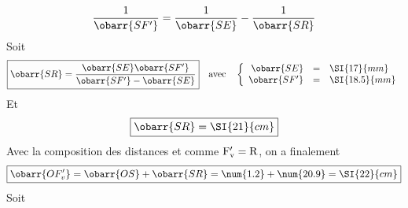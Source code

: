 \documentclass[../TDO4.tex]{subfiles}%
\begin{document}
\begin{blocQR}
{\begin{center}
\begin{tcn}
				\[
					\frac{1}{\obarr{SF'}} =
					\frac{1}{\obarr{SE}} -
					\frac{1}{\obarr{SR}}
				\]
				Soit
				\begin{equation*}
					\boxed{
						\obarr{SR} =
						\frac{
							\obarr{SE}\obarr{SF'}}{
							\obarr{SF'}-\obarr{SE}}
					}
					\quad \text{avec}\quad
					\left\{
					\begin{array}{rcl}
						\obarr{SE}  & = & \SI{17}{mm}   \\
						\obarr{SF'} & = & \SI{18.5}{mm}
					\end{array}
					\right.
				\end{equation*}
				Et
				\[
					\boxed{\obarr{SR} = \SI{21}{cm}}
				\]
				Avec la composition des distances et comme $\rm F'_v = R$,
				on a finalement
				\[
					\boxed{
						\obarr{OF'_v} =
						\obarr{OS} + \obarr{SR} =
						\num{1.2}+\num{20.9} = \SI{22}{cm}}
				\]
				Soit 
			\end{tcn}
		\end{center}
	}%
\end{blocQR}
\end{document}
